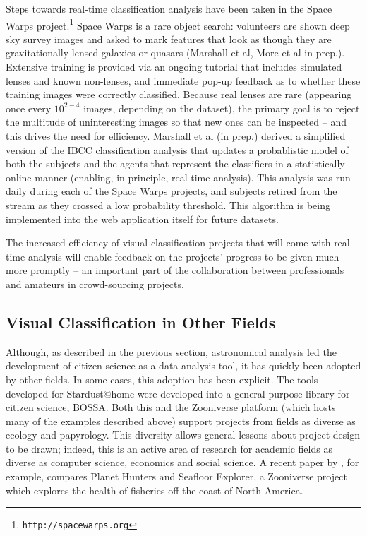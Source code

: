 \documentclass{ar2e}
\def\CaseStudy#1{\noindent{\it\bf #1 \,\,\,\,}}
\def\url#1{\texttt{#1}}
\begin{document}
\CaseStudy{Rare event detection: Space Warps} 
Steps towards real-time classification analysis have been taken in the Space
Warps project.\footnote{\url{http://spacewarps.org}} 
Space Warps is a rare object search: volunteers are shown deep
sky survey images and asked to mark features that look as though they are
gravitationally lensed galaxies or quasars (Marshall et al, More et al in prep.).
Extensive training is
provided via an ongoing tutorial that includes simulated lenses and known
non-lenses, and immediate pop-up feedback as to whether these training images
were correctly classified. Because real lenses are rare (appearing once every
$10^{2-4}$ images, depending on the dataset), the primary goal is to reject the
multitude of uninteresting images so that new ones can be inspected -- and this
drives the need for efficiency. Marshall et al (in prep.) derived a
simplified version of the IBCC classification analysis that updates a
probablistic model of both the subjects and the agents that represent the
classifiers in a statistically online manner (enabling, in principle, real-time
analysis). This
analysis was run daily during each of the Space Warps projects, and subjects
retired from the stream as they crossed a low probability threshold. This
algorithm is being implemented into the web application itself for future
datasets. 

The increased  efficiency of visual classification projects that will come with
real-time analysis will enable feedback on the projects' progress to be given
much more promptly -- an important part of the collaboration between
professionals and amateurs in crowd-sourcing projects.



\subsection{Visual Classification in Other Fields}
\label{sec:class:non-astro}

Although, as described in the previous section, astronomical analysis led the
development of citizen science as a data analysis tool, it has quickly been
adopted by other fields. In some cases, this adoption has been explicit. The
tools developed for Stardust@home were developed into a general purpose
library for citizen science, BOSSA.
Both this and the Zooniverse platform (which hosts many of the examples
described above) support projects from fields as diverse as ecology and
papyrology. This diversity allows general lessons about project
design to be drawn; indeed, this is an active area of research for academic
fields as diverse as computer science, economics and social science. A recent paper
by \citet{Crowston}, for example, compares Planet Hunters and Seafloor Explorer, 
a Zooniverse project which explores the health of fisheries off the coast of
North America. 
\end{document}
